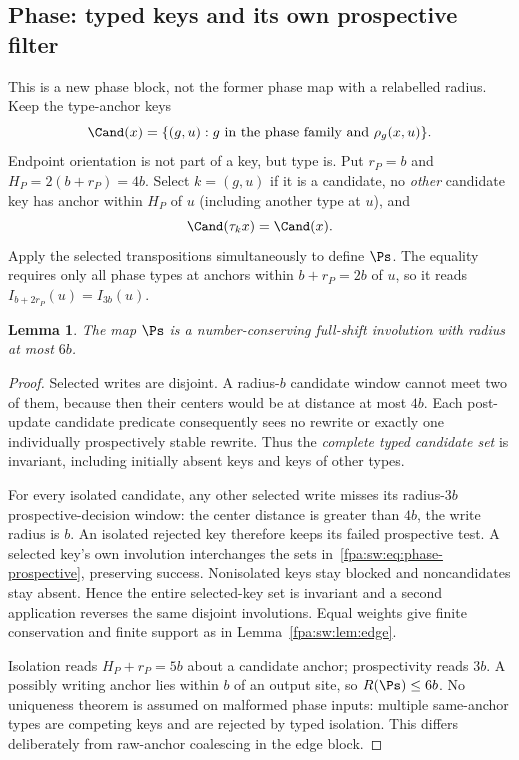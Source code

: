 \documentclass[11pt,a4paper]{article}
\numberwithin{equation}{section}
\newtheorem{lemma}[theorem]{Lemma}
\begin{document}
\subsection{Phase: typed keys and its own prospective filter}
This is a new phase block, not the former phase map with a relabelled radius. Keep the type-anchor keys
\[
\Cand(x)=\{(g,u):g\text{ in the phase family and }\rho_g(x,u)\}.
\]
Endpoint orientation is not part of a key, but type is. Put $r_P=b$ and $H_P=2(b+r_P)=4b$. Select $k=(g,u)$ if it is a candidate, no \emph{other} candidate key has anchor within $H_P$ of $u$ (including another type at $u$), and
\begin{equation}\label{fpa:sw:eq:phase-prospective}
\Cand(\tau_kx)=\Cand(x).
\end{equation}
Apply the selected transpositions simultaneously to define $\Ps$. The equality requires only all phase types at anchors within $b+r_P=2b$ of $u$, so it reads $I_{b+2r_P}(u)=I_{3b}(u)$.

\begin{lemma}\label{fpa:sw:lem:phase}
The map $\Ps$ is a number-conserving full-shift involution with radius at most $6b$.
\end{lemma}
\begin{proof}
Selected writes are disjoint. A radius-$b$ candidate window cannot meet two of them, because then their centers would be at distance at most $4b$. Each post-update candidate predicate consequently sees no rewrite or exactly one individually prospectively stable rewrite. Thus the \emph{complete typed candidate set} is invariant, including initially absent keys and keys of other types.

For every isolated candidate, any other selected write misses its radius-$3b$ prospective-decision window: the center distance is greater than $4b$, the write radius is $b$. An isolated rejected key therefore keeps its failed prospective test. A selected key's own involution interchanges the sets in~\eqref{fpa:sw:eq:phase-prospective}, preserving success. Nonisolated keys stay blocked and noncandidates stay absent. Hence the entire selected-key set is invariant and a second application reverses the same disjoint involutions. Equal weights give finite conservation and finite support as in Lemma~\ref{fpa:sw:lem:edge}.

Isolation reads $H_P+r_P=5b$ about a candidate anchor; prospectivity reads $3b$. A possibly writing anchor lies within $b$ of an output site, so $R(\Ps)\le6b$. No uniqueness theorem is assumed on malformed phase inputs: multiple same-anchor types are competing keys and are rejected by typed isolation. This differs deliberately from raw-anchor coalescing in the edge block.
\end{proof}
\end{document}
